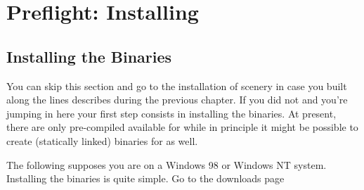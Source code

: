 
\chapter{Preflight: Installing \FlightGear \label{prefligh}}

\section{Installing the Binaries}
You can skip this section and go to the installation of scenery in
case you built \FlightGear along the lines describes during the
previous chapter. If you did not and you're jumping in here your
first step consists in installing the binaries. At present, there
are only pre-compiled  available for
 while in principle it might be possible to
create (statically linked) binaries for  as well.

The following supposes you are on a Windows 98 or Windows
NT system. Installing the binaries is quite
simple. Go to the \FlightGear downloads page



